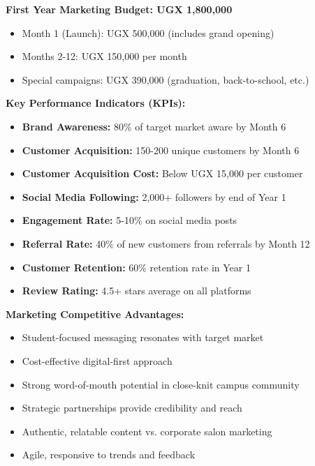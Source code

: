 \textbf{First Year Marketing Budget: UGX 1,800,000}
\begin{itemize}[leftmargin=2em]
    \item Month 1 (Launch): UGX 500,000 (includes grand opening)
    \item Months 2-12: UGX 150,000 per month
    \item Special campaigns: UGX 390,000 (graduation, back-to-school, etc.)
\end{itemize}

\vspace{1em}

\begin{tcolorbox}[mybox, title=\textbf{Marketing Strategy Success Metrics}]
\textbf{Key Performance Indicators (KPIs):}
\begin{itemize}[leftmargin=1em, itemsep=0pt]
    \item \textbf{Brand Awareness:} 80\% of target market aware by Month 6
    \item \textbf{Customer Acquisition:} 150-200 unique customers by Month 6
    \item \textbf{Customer Acquisition Cost:} Below UGX 15,000 per customer
    \item \textbf{Social Media Following:} 2,000+ followers by end of Year 1
    \item \textbf{Engagement Rate:} 5-10\% on social media posts
    \item \textbf{Referral Rate:} 40\% of new customers from referrals by Month 12
    \item \textbf{Customer Retention:} 60\% retention rate in Year 1
    \item \textbf{Review Rating:} 4.5+ stars average on all platforms
\end{itemize}

\textbf{Marketing Competitive Advantages:}
\begin{itemize}[leftmargin=1em, itemsep=0pt]
    \item Student-focused messaging resonates with target market
    \item Cost-effective digital-first approach
    \item Strong word-of-mouth potential in close-knit campus community
    \item Strategic partnerships provide credibility and reach
    \item Authentic, relatable content vs. corporate salon marketing
    \item Agile, responsive to trends and feedback
\end{itemize}
\end{tcolorbox}

